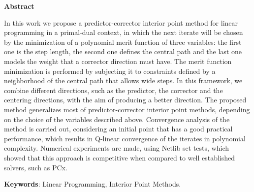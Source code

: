 \begin{center}
  \large{\textbf{Abstract}}
\end{center}




In this work we propose a predictor-corrector interior point method for linear programming in a primal-dual context, in which the next iterate will be chosen by the minimization of a polynomial merit function  of three variables: the first one is the step length, the second one defines the central path and the last one models the weight that a corrector direction must have. The merit function minimization is performed by subjecting it to constraints defined by a neighborhood of the central path that allows wide steps. In this framework, we combine  different directions, such as the predictor, the corrector and the centering directions, with the aim of producing a better direction. The proposed method generalizes most of predictor-corrector interior point methods, depending on the choice of the variables described above. Convergence analysis of the method is carried out,  considering an initial point that has a good practical performance, which results in Q-linear convergence of the iterates in polynomial complexity. Numerical experiments are made, using Netlib set tests, which  showed that this approach is competitive when compared to  well established solvers, such as PCx.





\vspace{.5cm}
\textbf{Keywords}:
Linear Programming, Interior Point Methods.
